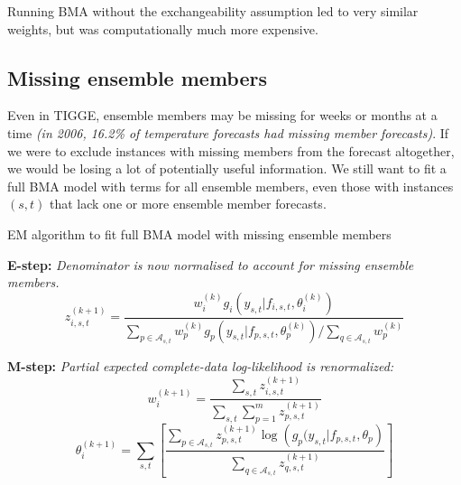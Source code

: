 \documentclass[10pt,fleqn]{article}
\begin{document}
Running BMA without the exchangeability assumption led to very similar weights, but was computationally much more expensive.


\subsection{Missing ensemble members}

Even in TIGGE, ensemble members may be missing for weeks or months at a time \cite{Park2008} \textit{(in 2006, 16.2\% of temperature forecasts had missing member forecasts)}. If we were to exclude instances with missing members from the forecast altogether, we would be losing a lot of potentially useful information. We still want to fit a full BMA model with terms for all ensemble members, even those with instances $(s,t)$ that lack one or more ensemble member forecasts.

\begin{algorithm}%
    \caption{EM algorithm to fit full BMA model with missing ensemble members}
    \label{alg:EM-missing}
\vspace{5pt}



\textbf{E-step:} \textit{Denominator is now normalised to account for missing ensemble members.}
%
\vspace{5pt}
\[ z_{i,s,t}^{(k+1)} = \frac{w_i^{(k)} g_i (y_{s,t} | f_{i,s,t}, \theta_i^{(k)})}
	{\sum\limits_{p\in \mathcal{A}_{s,t}} w_p^{(k)} g_p (y_{s,t}|f_{p,s,t}, \theta_p ^{(k)} ) \bigg/
	 \sum\limits_{q \in \mathcal{A}_{s,t}} w_p^{(k)}}\]
%
\vspace{5pt}

\textbf{M-step:}  \textit{Partial expected complete-data log-likelihood is renormalized:}
%
\[ w_i^{(k+1)} = \frac{\sum\limits_{s,t} z_{i,s,t}^{(k+1)}}%
	{\sum\limits_{s,t} \sum\limits_{p=1}^m z_{p,s,t}^{(k+1)}} \]
%
\[ \theta_i^{(k+1)} = \sum\limits_{s, t} \left[\frac{ \sum\limits_{p \in \mathcal{A}_{s,t}} z_{p,s,t}^{(k+1)} \log \left( g_p(y_{s,t} | f_{p,s,t}, \theta_p \right)}
	{\sum\limits_{q \in \mathcal{A}_{s,t}} z_{q,s,t}^{(k+1)}} \right]\]
%
\vspace{5pt}
\end{algorithm}
\end{document}
